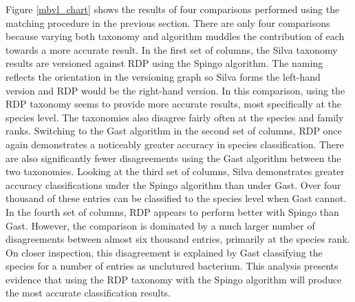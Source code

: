 Figure \ref{mbvl_chart} shows the results of four comparisons performed using the matching procedure in the previous section.
There are only four comparisons because varying both taxonomy and algorithm muddles the contribution of each towards a more accurate result.
In the first set of columns, the Silva taxonomy results are versioned against RDP using the Spingo algorithm.
The naming reflects the orientation in the versioning graph so Silva forms the left-hand version and RDP would be the right-hand version.
In this comparison, using the RDP taxonomy seems to provide more accurate results, most specifically at the species level.
The taxonomies also disagree fairly often at the species and family ranks.
Switching to the Gast algorithm in the second set of columns, RDP once again demonstrates a noticeably greater accuracy in species classification.
There are also significantly fewer disagreements using the Gast algorithm between the two taxonomies.
Looking at the third set of columns, Silva demonstrates greater accuracy classifications under the Spingo algorithm than under Gast.
Over four thousand of these entries can be classified to the species level when Gast cannot.
In the fourth set of columns, RDP appears to perform better with Spingo than Gast.
However, the comparison is dominated by a much larger number of disagreements between almost six thousand entries, primarily at the species rank.
On closer inspection, this disagreement is explained by Gast classifying the species for a number of entries as unclutured bacterium.
This analysis presents evidence that using the RDP taxonomy with the Spingo algorithm will produce the most accurate classification results.